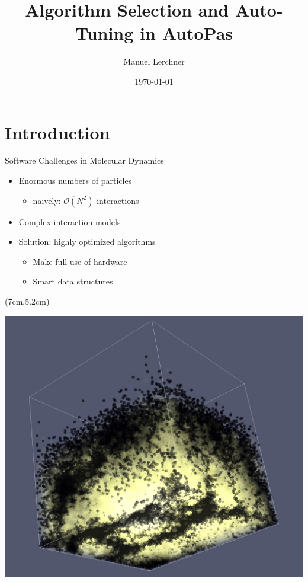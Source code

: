\documentclass[
	10pt,
	t		%
]{beamer}
\title{Algorithm Selection and Auto-Tuning in AutoPas}
\author{Manuel Lerchner}
\date{\today}
\begin{document}
\maketitle

\setcounter{framenumber}{0}

\section{Introduction}

\begin{frame}{Software Challenges in Molecular Dynamics}
    \begin{itemize}
        \item Enormous numbers of particles
              \begin{itemize}
                  \item naively: $\mathcal{O}(N^2)$ interactions
              \end{itemize}
        \item Complex interaction models
        \item Solution: highly optimized algorithms
              \begin{itemize}
                  \item Make full use of hardware
                  \item Smart data structures
              \end{itemize}
    \end{itemize}



    \begin{textblock*}{4.5cm}(7cm,5.2cm)
        \begin{center}
            \includegraphics[width=\textwidth]{figures/rayleigh_taylor_instability_3d.png}
        \end{center}
    \end{textblock*}


\end{frame}
\end{document}
